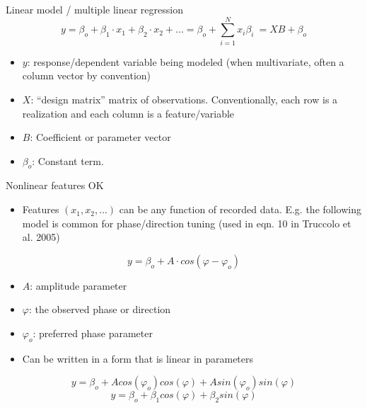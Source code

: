 \documentclass[svgnames,13pt,handout]{beamer}
\DeclareRobustCommand{\emph}[1]{\textbf{{\color{emphasizecolor} #1}}}
\begin{document}
\begin{frame}{Linear model / multiple linear regression}
\[y = \beta_o + \beta_1 \cdot x_1 + \beta_2 \cdot x_2 + ... = \beta_o + \sum_{i=1}^N x_i \beta_i \ = XB + \beta_o\]
\begin{itemize}
	\item \emph{$y$}: response/dependent variable being modeled (when multivariate, often a column vector by convention)
	\item \emph{$X$}: ``design matrix'' matrix of observations. Conventionally, each row is a realization and each column is a feature/variable
	\item \emph{$B$}: Coefficient or parameter vector
	\item \emph{$\beta_o$}: Constant term.
\end{itemize}
\end{frame} 

\begin{frame}{Nonlinear features OK}
\begin{itemize}
	\item Features $(x_1,x_2,...)$ can be any function of recorded data. E.g. the following model is common for phase/direction tuning (used in eqn. 10 in Truccolo et al. 2005)
	\end{itemize}
\[y = \beta_o + A\cdot cos(\varphi-\varphi_o)\]
\vspace{-2em}
\begin{itemize}
	\item <2->\emph{$A$}: amplitude parameter
	\item <3->\emph{$\varphi$}: the observed phase or direction
	\item <4->\emph{$\varphi_o$}: preferred phase parameter
	\item <5->Can be written in a form that is linear in parameters
	\end{itemize}
\begin{overprint}
	\[y = \beta_o + A cos(\varphi_o) cos(\varphi) +  A sin(\varphi_o) sin(\varphi)\]
	\onslide<6>
	\[y = \beta_o + \beta_1 cos(\varphi) + \beta_2 sin(\varphi)\]
\end{overprint}
\end{frame} 


\end{document}
